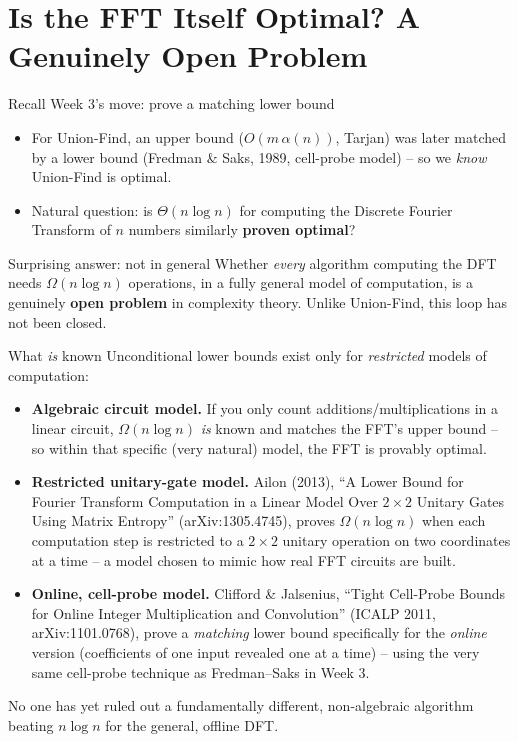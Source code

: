 \documentclass[11pt,aspectratio=169]{beamer}
\begin{document}
\section{Is the FFT Itself Optimal? A Genuinely Open Problem}

\begin{frame}{Recall Week 3's move: prove a matching lower bound}
  \begin{itemize}
    \item For Union-Find, an upper bound ($O(m\,\alpha(n))$, Tarjan) was later matched by
    a lower bound (Fredman \& Saks, 1989, cell-probe model) -- so we \emph{know}
    Union-Find is optimal.
    \item Natural question: is $\Theta(n\log n)$ for computing the Discrete Fourier
    Transform of $n$ numbers similarly \textbf{proven optimal}?
  \end{itemize}
  \begin{alertblock}{Surprising answer: not in general}
    Whether \emph{every} algorithm computing the DFT needs $\Omega(n\log n)$ operations,
    in a fully general model of computation, is a genuinely \textbf{open problem} in
    complexity theory. Unlike Union-Find, this loop has not been closed.
  \end{alertblock}
\end{frame}

\begin{frame}{What \emph{is} known}
  \small
  Unconditional lower bounds exist only for \emph{restricted} models of computation:
  \begin{itemize}
    \item \textbf{Algebraic circuit model.} If you only count additions/multiplications
    in a linear circuit, $\Omega(n\log n)$ \emph{is} known and matches the FFT's upper
    bound -- so within that specific (very natural) model, the FFT is provably optimal.
    \item \textbf{Restricted unitary-gate model.} Ailon (2013), ``A Lower Bound for
    Fourier Transform Computation in a Linear Model Over $2{\times}2$ Unitary Gates
    Using Matrix Entropy'' (arXiv:1305.4745), proves $\Omega(n\log n)$ when each
    computation step is restricted to a $2{\times}2$ unitary operation on two
    coordinates at a time -- a model chosen to mimic how real FFT circuits are built.
    \item \textbf{Online, cell-probe model.} Clifford \& Jalsenius, ``Tight Cell-Probe
    Bounds for Online Integer Multiplication and Convolution'' (ICALP 2011,
    arXiv:1101.0768), prove a \emph{matching} lower bound specifically for the
    \emph{online} version (coefficients of one input revealed one at a time) --
    using the very same cell-probe technique as Fredman--Saks in Week 3.
  \end{itemize}
  No one has yet ruled out a fundamentally different, non-algebraic algorithm beating
  $n\log n$ for the general, offline DFT.
\end{frame}
\end{document}
